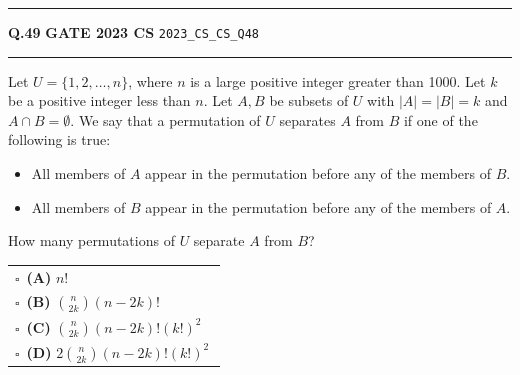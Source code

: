 \documentclass[a4paper,10pt]{article}
\begin{document}
\vspace{6pt}\hrule height 0.35pt\vspace{6pt}
\noindent
\begin{tcolorbox}[
    blanker,
    sidebyside,
    sidebyside align=top,
    lefthand width=0.55\textwidth,
    top=4pt, bottom=4pt, left=0pt, right=0pt,
    middle=16pt,
    underlay={
        \draw[dashed, black!80, line width=0.8pt, dash pattern=on 4pt off 3pt]
            ([xshift=0.55\textwidth+8pt]frame.north west) --
            ([xshift=0.55\textwidth+8pt]frame.south west);
    }
]
\textbf{Q.49}  \hfill {\footnotesize\textbf{GATE 2023 CS} \quad \tiny\texttt{2023\_CS\_CS\_Q48}}
\vspace{2pt}\hrule height 0.3pt\vspace{4pt}

Let $U = \{1, 2, \dots, n\}$, where $n$ is a large positive integer greater than 1000. Let $k$ be a positive integer less than $n$. Let $A, B$ be subsets of $U$ with $|A| = |B| = k$ and $A \cap B = \emptyset$. We say that a permutation of $U$ separates $A$ from $B$ if one of the following is true:
\begin{itemize}[itemsep=0pt,topsep=2pt]
\item All members of $A$ appear in the permutation before any of the members of $B$.
\item All members of $B$ appear in the permutation before any of the members of $A$.
\end{itemize}
How many permutations of $U$ separate $A$ from $B$?

\par\vspace{6pt}\noindent
\begin{tabular}{@{}p{0.98\linewidth}@{}}
$\square$\ \textbf{(A)} $n!$ \\
\addlinespace[3pt]
$\square$\ \textbf{(B)} $\binom{n}{2k} (n - 2k)!$ \\
\addlinespace[3pt]
$\square$\ \textbf{(C)} $\binom{n}{2k} (n - 2k)! (k!)^2$ \\
\addlinespace[3pt]
$\square$\ \textbf{(D)} $2 \binom{n}{2k} (n - 2k)! (k!)^2$
\end{tabular}

\tcblower


\end{tcolorbox}
\end{document}

